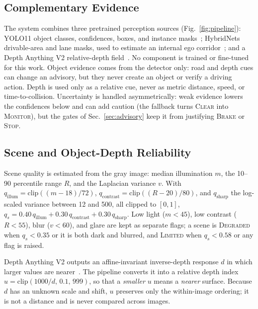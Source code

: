 \documentclass[conference,a4paper]{IEEEtran}
\newcommand{\st}[1]{\textsc{#1}}
\begin{document}
\subsection{Complementary Evidence}
The system combines three pretrained perception sources (Fig.~\ref{fig:pipeline}): YOLO11 object classes, confidences, boxes, and instance masks~\cite{ultralytics}; HybridNets drivable-area and lane masks, used to estimate an internal ego corridor~\cite{hybridnets}; and a Depth Anything V2 relative-depth field~\cite{dav2}. No component is trained or fine-tuned for this work. Object evidence comes from the detector only: road and depth cues can change an advisory, but they never create an object or verify a driving action. Depth is used only as a relative cue, never as metric distance, speed, or time-to-collision. Uncertainty is handled asymmetrically: weak evidence lowers the confidences below and can add caution (the fallback turns \st{Clear} into \st{Monitor}), but the gates of Sec.~\ref{sec:advisory} keep it from justifying \st{Brake} or \st{Stop}.

\subsection{Scene and Object-Depth Reliability}
Scene quality is estimated from the gray image: median illumination $m$, the 10--90 percentile range $R$, and the Laplacian variance $v$. With $q_{\mathrm{illum}}=\mathrm{clip}((m-18)/72)$, $q_{\mathrm{contrast}}=\mathrm{clip}((R-20)/80)$, and $q_{\mathrm{sharp}}$ the log-scaled variance between 12 and 500, all clipped to $[0,1]$, \mbox{$q_s = 0.40\,q_{\mathrm{illum}} + 0.30\,q_{\mathrm{contrast}} + 0.30\,q_{\mathrm{sharp}}$}. Low light ($m<45$), low contrast ($R<55$), blur ($v<60$), and glare are kept as separate flags; a scene is \st{Degraded} when $q_s<0.35$ or it is both dark and blurred, and \st{Limited} when $q_s<0.58$ or any flag is raised.

Depth Anything V2 outputs an affine-invariant inverse-depth response $d$ in which larger values are nearer~\cite{dav2,midas}. The pipeline converts it into a relative depth index \mbox{$u=\mathrm{clip}(1000/d,\,0.1,\,999)$}, so that a \emph{smaller} $u$ means a \emph{nearer} surface. Because $d$ has an unknown scale and shift, $u$ preserves only the within-image ordering; it is not a distance and is never compared across images.
\end{document}
